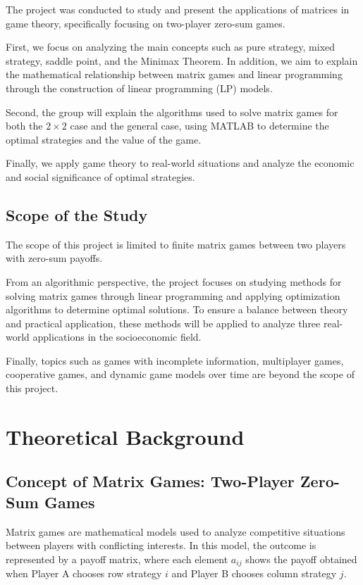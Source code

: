 \documentclass[12pt,a4paper]{article}
\begin{document}
The project was conducted to study and present the applications of matrices in game theory, specifically focusing on two-player zero-sum games. 

First, we focus on analyzing the main concepts such as pure strategy, mixed strategy, saddle point, and the Minimax Theorem. In addition, we aim to explain the mathematical relationship between matrix games and linear programming through the construction of linear programming (LP) models. 

Second, the group will explain the algorithms used to solve matrix games for both the \(2 \times 2\) case and the general case, using MATLAB to determine the optimal strategies and the value of the game. 

Finally, we apply game theory to real-world situations and analyze the economic and social significance of optimal strategies.


\subsection{Scope of the Study}

The scope of this project is limited to finite matrix games between two players with zero-sum payoffs.  

From an algorithmic perspective, the project focuses on studying methods for solving matrix games through linear programming and applying optimization algorithms to determine optimal solutions. To ensure a balance between theory and practical application, these methods will be applied to analyze three real-world applications in the socioeconomic field.

Finally, topics such as games with incomplete information, multiplayer games, cooperative games, and dynamic game models over time are beyond the scope of this project.



\section{Theoretical Background}
\subsection{Concept of Matrix Games: Two-Player Zero-Sum Games}

Matrix games are mathematical models used to analyze competitive situations between players with conflicting interests. In this model, the outcome is represented by a payoff matrix, where each element \(a_{ij}\) shows the payoff obtained when Player A chooses row strategy \(i\) and Player B chooses column strategy \(j\).
\end{document}
